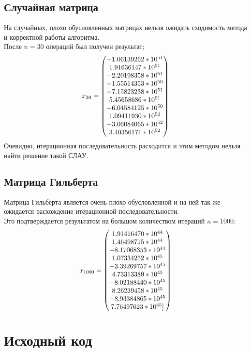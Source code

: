 \documentclass[../../report.tex]{subfiles}
\begin{document}
\subsection{Случайная матрица}
На случайных, плохо обусловленных матрицах нельзя ожидать сходимость метода и корректной работы алгоритма. \\
После $n=30$ операций был получен результат;
\[
x_{30} = \randomResult
\]
Очевидно, итерационная последовательность расходится и этим методом нельзя найти решение такой СЛАУ.

\subsection{Матрица Гильберта}
Матрица Гильберта является очень плохо обусловленной и на ней так же ожидается расхождение итерационной последовательности. \\
Это подтверждается результатом на большом количеством итераций $n=1000$:
\[
x_{1000} = \hilbertResult
\]

\section{Исходный код}
\end{document}
